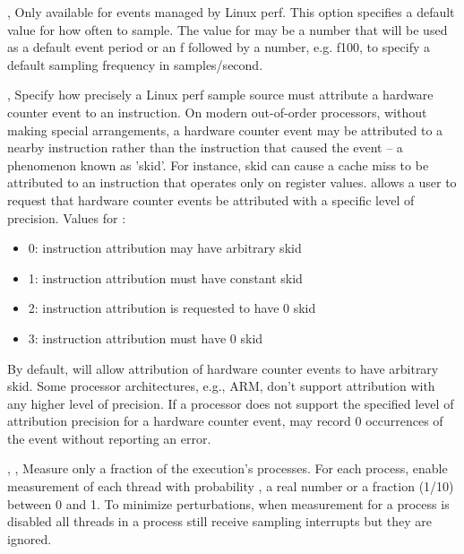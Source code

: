 \documentclass[english]{article}
\begin{document}
\begin{Description}
\item[\OptArg{-c}{howoften}, \OptArg{--count}{howoften}]
                       Only available for events managed by Linux perf. This option
                       specifies a default value for how often to sample. The value for  may be a number that will be used as a default
                       event period or an f followed by a number, e.g. f100, to specify a default sampling frequency in samples/second.

\item[\OptArg{-p}{level}, \OptArg{--precise-ip}{level}]
Specify how precisely a Linux perf sample source must attribute a hardware counter event to an instruction. 
On modern out-of-order processors, without making special arrangements, a hardware counter event may be attributed to a 
nearby instruction rather than the instruction that caused the event -- a phenomenon known as 'skid'. 
For instance, skid can cause a cache miss to be attributed to an instruction that operates only on register values. 
 allows a user to request that hardware counter events be attributed with a specific level of precision.
Values for :
\begin{itemize}
 \item 0: instruction attribution may have arbitrary skid
 \item 1: instruction attribution must have constant skid
 \item 2: instruction attribution is requested to have 0 skid
 \item 3: instruction attribution must have 0 skid
\end{itemize}

By default,  will allow attribution of hardware counter events to have arbitrary skid. 
Some processor architectures, e.g., ARM,  don't support attribution with any higher level of precision.
If a processor does not support the specified level of attribution precision for a hardware counter event, 
 may record 0 occurrences of the event without reporting an error.


\item[\OptArg{-f}{frac}, \OptArg{-fp}{frac}, \OptArg{--process-fraction}{frac}]
Measure only a fraction  of the execution's processes.
For each process, enable measurement of each thread with probability , a real number or a fraction (1/10) between 0 and 1.
To minimize perturbations, when measurement for a process is disabled
all threads in a process still receive sampling interrupts but they are ignored.


\end{Description}
\end{document}
